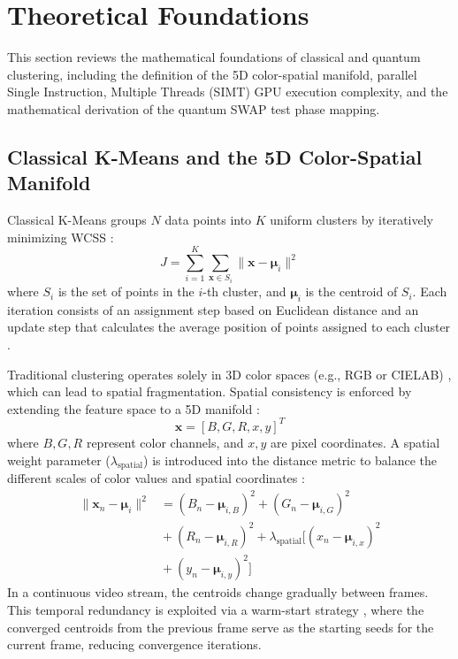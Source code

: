 \section{Theoretical Foundations}\label{sec:theory}
This section reviews the mathematical foundations of classical and quantum clustering, including the definition of the 5D color-spatial manifold, parallel Single Instruction, Multiple Threads (SIMT) GPU execution complexity, and the mathematical derivation of the quantum SWAP test phase mapping.

\subsection{Classical K-Means and the 5D Color-Spatial Manifold}
Classical K-Means groups $N$ data points into $K$ uniform clusters \cite{lloyd1982least} by iteratively minimizing WCSS \cite{krzanowski1988criterion}:
\begin{equation}
\label{eq:wcss}
J = \sum_{i=1}^{K} \sum_{\mathbf{x} \in S_i} \|\mathbf{x} - \boldsymbol{\mu}_i\|^2
\end{equation}
where $S_i$ is the set of points in the $i$-th cluster, and $\boldsymbol{\mu}_i$ is the centroid of $S_i$. Each iteration consists of an assignment step based on Euclidean distance and an update step that calculates the average position of points assigned to each cluster \cite{lloyd1982least}.

Traditional clustering operates solely in 3D color spaces (e.g., RGB or CIELAB) \cite{gonzalez2009digital}, which can lead to spatial fragmentation. Spatial consistency is enforced by extending the feature space to a 5D manifold \cite{achanta2012slic}:
\begin{equation}
\mathbf{x} = [B, G, R, x, y]^T
\end{equation}
where $B, G, R$ represent color channels, and $x, y$ are pixel coordinates. A spatial weight parameter ($\lambda_{\text{spatial}}$) is introduced into the distance metric to balance the different scales of color values and spatial coordinates \cite{shi2000normalized}:
\begin{align}
\|\mathbf{x}_n - \boldsymbol{\mu}_i\|^2 &= (B_n - \boldsymbol{\mu}_{i,B})^2 + (G_n - \boldsymbol{\mu}_{i,G})^2 \nonumber \\
&{}+ (R_n - \boldsymbol{\mu}_{i,R})^2 + \lambda_{\text{spatial}} \bigl[ (x_n - \boldsymbol{\mu}_{i,x})^2 \nonumber \\
&{}+ (y_n - \boldsymbol{\mu}_{i,y})^2 \bigr]
\end{align}
In a continuous video stream, the centroids change gradually between frames. This temporal redundancy is exploited via a warm-start strategy \cite{szeliski2022computer}, where the converged centroids from the previous frame serve as the starting seeds for the current frame, reducing convergence iterations.

